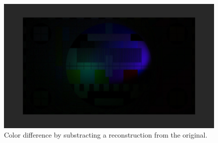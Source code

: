 \begin{figure}[htb]
	\includegraphics[width=\textwidth]{_raw_resources/light-reconstruction/color_difference.png}
	\caption{Color difference by substracting a reconstruction from the 
	original.}
	\label{fig:light-reconstruction:difference}
\end{figure}

